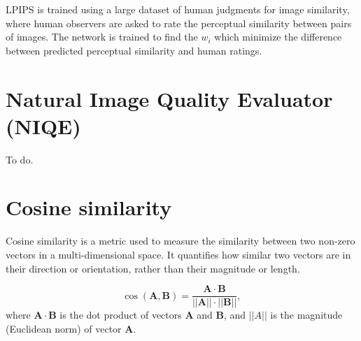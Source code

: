 LPIPS is trained using a large dataset of human judgments for image
similarity, where human observers are asked to rate the perceptual
similarity between pairs of images. The network is trained to find the
$w_i$ which minimize the difference between predicted perceptual
similarity and human ratings.


\section{Natural Image Quality Evaluator (NIQE)}

To do.


\section{Cosine similarity}
Cosine similarity is a metric used to measure the similarity between
two non-zero vectors in a multi-dimensional space. It quantifies how
similar two vectors are in their direction or orientation, rather than
their magnitude or length.

\begin{equation}
  \cos(\mathbf{A}, \mathbf{B}) = \frac{\mathbf{A}\cdot\mathbf{B}}{||\mathbf{A}||\cdot||\mathbf{B}||},
\end{equation}
where $\mathbf{A}\cdot\mathbf{B}$ is the dot product of vectors
$\mathbf{A}$ and $\mathbf{B}$, and $||A||$ is the magnitude (Euclidean
norm) of vector $\mathbf{A}$.
